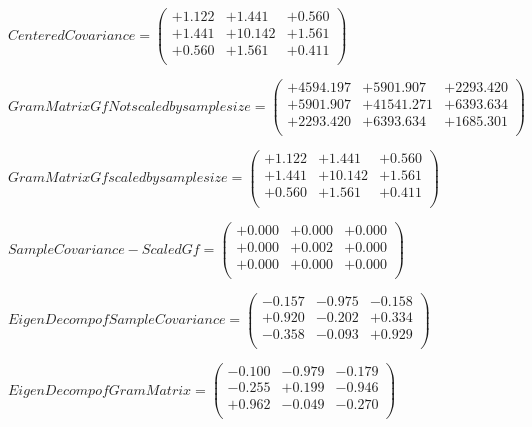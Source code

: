 \documentclass[9pt]{article}
\theoremstyle{plain}
\theoremstyle{definition}
\theoremstyle{remark}
\numberwithin{equation}{section}
\begin{document}
$Centered Covariance = \left(
\begin{array}{
ccc}
+1.122 & +1.441 & +0.560 \\
+1.441 & +10.142 & +1.561 \\
+0.560 & +1.561 & +0.411 \\
\end{array}
\right)$ \newline 

$Gram Matrix Gf Not scaled by sample size = \left(
\begin{array}{
ccc}
+4594.197 & +5901.907 & +2293.420 \\
+5901.907 & +41541.271 & +6393.634 \\
+2293.420 & +6393.634 & +1685.301 \\
\end{array}
\right)$ \newline 

$Gram Matrix Gf  scaled by sample size = \left(
\begin{array}{
ccc}
+1.122 & +1.441 & +0.560 \\
+1.441 & +10.142 & +1.561 \\
+0.560 & +1.561 & +0.411 \\
\end{array}
\right)$ \newline 

$SampleCovariance - Scaled Gf = \left(
\begin{array}{
ccc}
+0.000 & +0.000 & +0.000 \\
+0.000 & +0.002 & +0.000 \\
+0.000 & +0.000 & +0.000 \\
\end{array}
\right)$ \newline 

$EigenDecomp of SampleCovariance = \left(
\begin{array}{
ccc}
-0.157 & -0.975 & -0.158 \\
+0.920 & -0.202 & +0.334 \\
-0.358 & -0.093 & +0.929 \\
\end{array}
\right)$ \newline 

$EigenDecomp of Gram Matrix = \left(
\begin{array}{
ccc}
-0.100 & -0.979 & -0.179 \\
-0.255 & +0.199 & -0.946 \\
+0.962 & -0.049 & -0.270 \\
\end{array}
\right)$ \newline 
\end{document}
